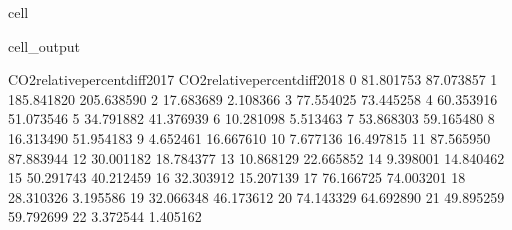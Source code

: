 \documentclass[letterpaper,10pt,english]{jupyterBook}
\begin{document}
\begin{sphinxuseclass}{cell}
\begin{sphinxVerbatimOutput}
\begin{sphinxuseclass}{cell_output}
\begin{sphinxVerbatim}[commandchars=\\\{\}]
    CO2\PYGZus{}relative\PYGZus{}percent\PYGZus{}diff\PYGZus{}2017 CO2\PYGZus{}relative\PYGZus{}percent\PYGZus{}diff\PYGZus{}2018  \PYGZbs{}
0                       \PYGZhy{}81.801753                     \PYGZhy{}87.073857   
1                      \PYGZhy{}185.841820                    \PYGZhy{}205.638590   
2                       \PYGZhy{}17.683689                      \PYGZhy{}2.108366   
3                        77.554025                      73.445258   
4                        60.353916                      51.073546   
5                       \PYGZhy{}34.791882                     \PYGZhy{}41.376939   
6                       \PYGZhy{}10.281098                       5.513463   
7                        53.868303                      59.165480   
8                        16.313490                      51.954183   
9                         4.652461                     \PYGZhy{}16.667610   
10                        7.677136                      16.497815   
11                       87.565950                      87.883944   
12                       30.001182                      18.784377   
13                      \PYGZhy{}10.868129                     \PYGZhy{}22.665852   
14                        9.398001                      14.840462   
15                       50.291743                      40.212459   
16                      \PYGZhy{}32.303912                     \PYGZhy{}15.207139   
17                       76.166725                      74.003201   
18                      \PYGZhy{}28.310326                      \PYGZhy{}3.195586   
19                       32.066348                      46.173612   
20                      \PYGZhy{}74.143329                     \PYGZhy{}64.692890   
21                       49.895259                      59.792699   
22                       \PYGZhy{}3.372544                       1.405162   


\end{sphinxVerbatim}
\end{sphinxuseclass}
\end{sphinxVerbatimOutput}
\end{sphinxuseclass}
\end{document}
